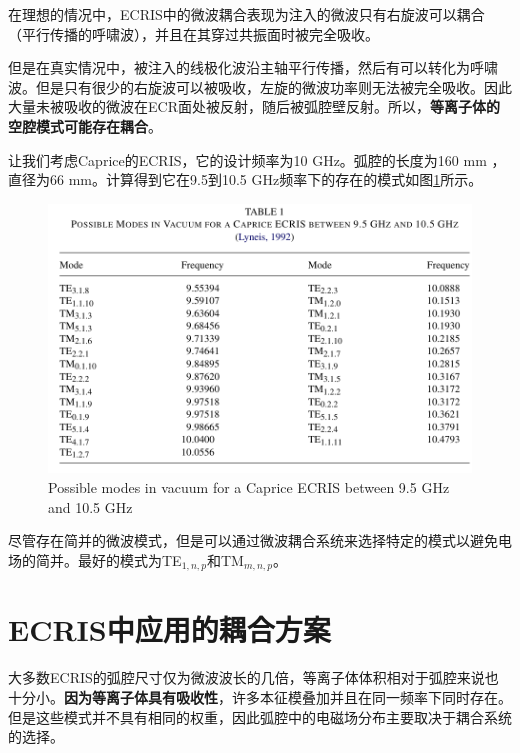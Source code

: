 \documentclass[fontset=windows]{article}
\begin{document}
在理想的情况中，ECRIS中的微波耦合表现为注入的微波只有右旋波可以耦合（平行传播的呼啸波），并且在其穿过共振面时被完全吸收。

但是在真实情况中，被注入的线极化波沿主轴平行传播，然后有可以转化为呼啸波。但是只有很少的右旋波可以被吸收，左旋的微波功率则无法被完全吸收。因此大量未被吸收的微波在ECR面处被反射，随后被弧腔壁反射。所以，\textbf{等离子体的空腔模式可能存在耦合}。

让我们考虑Caprice的ECRIS，它的设计频率为10 GHz。弧腔的长度为160 mm ，直径为66 mm。计算得到它在9.5到10.5 GHz频率下的存在的模式如图\ref{f-2}所示。
\begin{figure}
    \centering
    \includegraphics[width=1\textwidth]{possible modes.png}
    \caption{Possible modes in vacuum for a Caprice ECRIS between 9.5 GHz and 10.5 GHz}
    \label{f-2}
\end{figure}

尽管存在简并的微波模式，但是可以通过微波耦合系统来选择特定的模式以避免电场的简并。最好的模式为TE$_{1,n,p}$和TM$_{m,n,p}$。

\section{ECRIS中应用的耦合方案}
大多数ECRIS的弧腔尺寸仅为微波波长的几倍，等离子体体积相对于弧腔来说也十分小。\textbf{因为等离子体具有吸收性}，许多本征模叠加并且在同一频率下同时存在。但是这些模式并不具有相同的权重，因此弧腔中的电磁场分布主要取决于耦合系统的选择。
\end{document}
